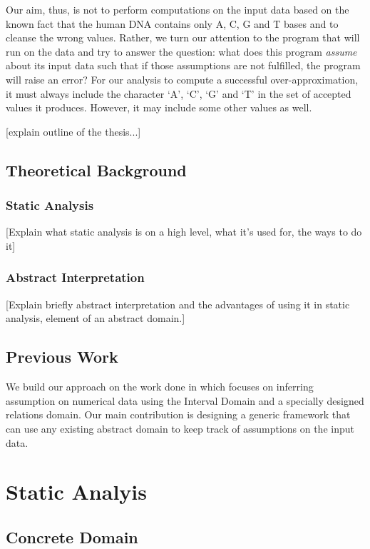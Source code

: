 \documentclass[10pt]{report}
\begin{document}
Our aim, thus, is not to perform computations on the input data based on the known fact that the human DNA contains only A, C, G and T bases and to cleanse the wrong values. Rather, we turn our attention to the program that will run on the data and try to answer the question: what does this program \textit{assume} about its input data such that if those assumptions are not fulfilled, the program will raise an error? For our analysis to compute a successful over-approximation, it must always include the character `A', `C', `G' and `T' in the set of accepted values it produces. However, it may include some other values as well. 

[explain outline of the thesis...]

\section{Theoretical Background} \label{theoritical}
\subsection{Static Analysis}
[Explain what static analysis is on a high level, what it's used for, the ways to do it]
\subsection{Abstract Interpretation}
[Explain briefly abstract interpretation and the advantages of using it in static analysis, element of an abstract domain.]

\section{Previous Work}

We build our approach on the work done in \cite{madelin} which focuses on inferring assumption on numerical data using the Interval Domain and a specially designed relations domain. Our main contribution is designing a generic framework that can use any existing abstract domain to keep track of assumptions on the input data. 

\chapter{Static Analyis} \label{analysis}

\section{Concrete Domain} \label{concrete}
\end{document}
